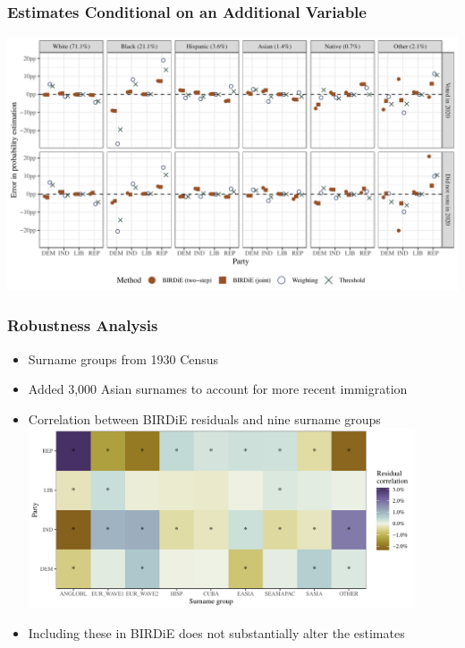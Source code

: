 \documentclass[handout]{beamer}
\begin{document}
\begin{frame}

  \frametitle{Estimates Conditional on an Additional Variable}

 \includegraphics[width=\textwidth]{../paper/figures/nc_addlcov_error.pdf}


\end{frame}

\begin{frame}

  \frametitle{Robustness Analysis}

  \begin{itemize}
  \item Surname groups from 1930 Census  
  \item Added 3,000 Asian surnames to account for more recent
    immigration
    \vfill
  \item Correlation between BIRDiE residuals and nine surname groups
    \includegraphics[width=0.9\textwidth]{../paper/figures/nc_sens_grp.pdf}

  \item Including these in BIRDiE does not substantially alter the estimates 
  \end{itemize}

\end{frame}
\end{document}
